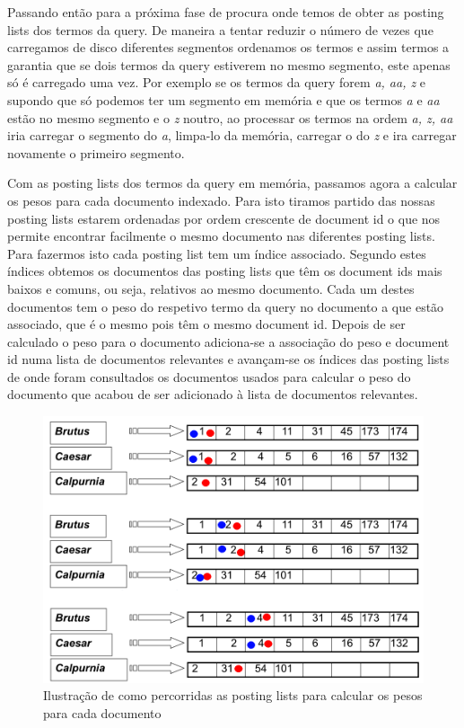 \documentclass[12pt]{article}
\begin{document}
Passando então para a próxima fase de procura onde temos de obter as
posting lists dos termos da query.
De maneira a tentar reduzir o número de vezes que carregamos de disco
diferentes segmentos ordenamos os termos e assim termos a garantia
que se dois termos da query estiverem no mesmo segmento, este apenas
só é carregado uma vez.
Por exemplo se os termos da query forem {\it a, aa, z} e supondo que
só podemos ter um segmento em memória e que os termos {\it a} e {\it
aa} estão no mesmo segmento e o {\it z} noutro, ao processar os
termos na ordem {\it a, z, aa} iria carregar o segmento do {\it a},
limpa-lo da memória, carregar o do {\it z} e ira carregar novamente o
primeiro segmento.

Com as posting lists dos termos da query em memória, passamos agora a
calcular os pesos para cada documento indexado.
Para isto tiramos partido das nossas posting lists estarem ordenadas
por ordem crescente de document id o que nos permite encontrar
facilmente o mesmo documento nas diferentes posting lists.
Para fazermos isto cada posting list tem um índice associado. Segundo
estes índices obtemos os documentos das posting lists que têm os
document ids mais baixos e comuns, ou seja, relativos ao mesmo
documento.
Cada um destes documentos tem o peso do respetivo termo da query no
documento a que estão associado, que é o mesmo pois têm o mesmo
document id.
Depois de ser calculado o peso para o documento adiciona-se a
associação do peso e document id numa lista de documentos relevantes
e avançam-se os índices das posting lists de onde foram consultados
os documentos usados para calcular o peso do documento que acabou de
ser adicionado à lista de documentos relevantes.

\begin{figure}[H]
  \center
   \includegraphics[width=\linewidth]{merge_algorithm.png}
  \caption{Ilustração de como percorridas as posting lists para calcular os pesos para cada documento}
  \label{fig:merge_algorithm}
\end{figure}
\end{document}
